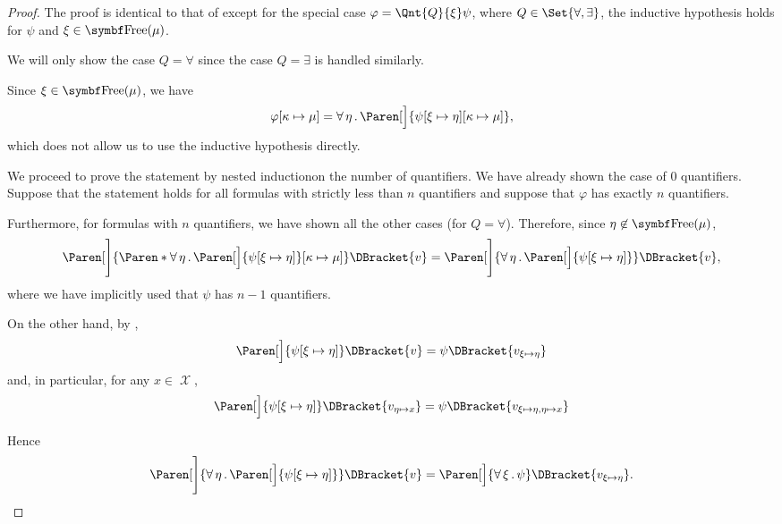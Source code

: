 \begin{proof}
   The proof is identical to that of  except for the special case \( \varphi = \Qnt{Q}{\xi} \psi \), where \( Q \in \Set{ \forall, \exists } \), the inductive hypothesis holds for \( \psi \) and \( \xi \in \Bold{Free}(\mu) \).

  We will only show the case \( Q = \forall \) since the case \( Q = \exists \) is handled similarly.

  Since \( \xi \in \Bold{Free}(\mu) \), we have
  \begin{equation*}
    \varphi[\kappa \mapsto \mu]
    =
    \ForAll{\eta} \Paren[\Big]{ \psi[\xi \mapsto \eta][\kappa \mapsto \mu] },
  \end{equation*}
  which does not allow us to use the inductive hypothesis directly.

  We proceed to prove the statement by nested induction\IND on the number of quantifiers. We have already shown the case of \( 0 \) quantifiers. Suppose that the statement holds for all formulas with strictly less than \( n \) quantifiers and suppose that \( \varphi \) has exactly \( n \) quantifiers.

  Furthermore, for formulas with \( n \) quantifiers, we have shown all the other cases (for \( Q = \forall \)). Therefore, since \( \eta \not\in \Bold{Free}(\mu) \),
  \begin{equation}\label{eq:thm:first_order_substitution_equivalence/term_in_formula/nested_induction}
    \Paren[\Bigg]{ \Paren*{ \ForAll{\eta} \Paren[\Big]{ \psi[\xi \mapsto \eta] } }[\kappa \mapsto \mu] }\DBracket{v}
    =
    \Paren[\Bigg]{\ForAll{\eta} \Paren[\Big]{ \psi[\xi \mapsto \eta] } }\DBracket{v},
  \end{equation}
  where we have implicitly used that \( \psi \) has \( n - 1 \) quantifiers.

  On the other hand, by ,
  \begin{equation*}
    \Paren[\Big]{ \psi[\xi \mapsto \eta] }\DBracket{v} = \psi\DBracket{v_{\xi \mapsto \eta}}
  \end{equation*}
  and, in particular, for any \( x \in \mscrX \),
  \begin{equation*}
    \Paren[\Big]{ \psi[\xi \mapsto \eta] }\DBracket{v_{\eta \mapsto x}} = \psi\DBracket{v_{\xi \mapsto \eta,\eta \mapsto x}}
  \end{equation*}

  Hence
  \begin{equation}\label{eq:thm:first_order_substitution_equivalence/term_in_formula/modified_assignment}
    \Paren[\Bigg]{\ForAll{\eta} \Paren[\Big]{ \psi[\xi \mapsto \eta] } }\DBracket{v}
    =
    \Paren[\Big]{\ForAll{\xi} \psi }\DBracket{v_{\xi \mapsto \eta}}.
  \end{equation}


\end{proof}

